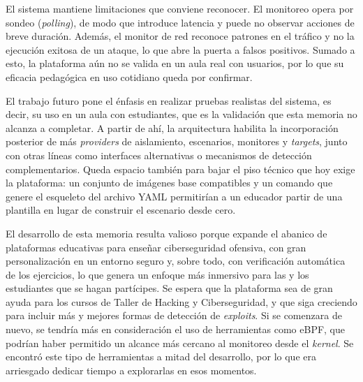 El sistema mantiene limitaciones que conviene reconocer. El monitoreo opera por
sondeo (\textit{polling}), de modo que introduce latencia y puede no observar
acciones de breve duración. Además, el monitor de red reconoce patrones en el
tráfico y no la ejecución exitosa de un ataque, lo que abre la puerta a falsos
positivos. Sumado a esto, la plataforma aún no se valida en un aula real con
usuarios, por lo que su eficacia pedagógica en uso cotidiano queda por
confirmar.

El trabajo futuro pone el énfasis en realizar pruebas realistas del sistema, es
decir, su uso en un aula con estudiantes, que es la validación que esta
memoria no alcanza a completar. A partir de ahí, la arquitectura habilita la
incorporación posterior de más \textit{providers} de aislamiento, escenarios,
monitores y \textit{targets}, junto con otras líneas como interfaces
alternativas o mecanismos de detección complementarios. Queda espacio también
para bajar el piso técnico que hoy exige la plataforma: un conjunto de imágenes
base compatibles y un comando que genere el esqueleto del archivo YAML
permitirían a un educador partir de una plantilla en lugar de construir el
escenario desde cero.

El desarrollo de esta memoria resulta valioso porque expande el abanico de
plataformas educativas para enseñar ciberseguridad ofensiva, con gran
personalización en un entorno seguro y, sobre todo, con verificación automática
de los ejercicios, lo que genera un enfoque más inmersivo para las y los
estudiantes que se hagan partícipes. Se espera que la plataforma sea de gran
ayuda para los cursos de Taller de Hacking y Ciberseguridad, y que siga
creciendo para incluir más y mejores formas de detección de \textit{exploits}.
Si se comenzara de nuevo, se tendría más en consideración el uso de herramientas
como
eBPF, que podrían haber permitido un alcance más cercano al monitoreo desde el
\textit{kernel}. Se encontró este tipo de herramientas a mitad del desarrollo,
por lo que
era arriesgado dedicar tiempo a explorarlas en esos momentos.
